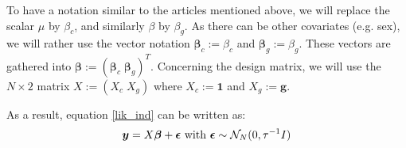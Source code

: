 \documentclass[10pt]{article}
\newcommand{\Norm}{{\mathcal{N}}} %
\newcommand{\yv}{\mbox{\boldmath$y$}}
\begin{document}
To have a notation similar to the articles mentioned above, we will replace the scalar $\mu$ by $\beta_c$, and similarly $\beta$ by $\beta_g$.
As there can be other covariates (e.g. sex), we will rather use the vector notation $\bm{\beta}_c := \beta_c$ and $\bm{\beta}_g := \beta_g$.
These vectors are gathered into $\bm{\beta} := (\bm{\beta}_c \; \bm{\beta}_g)^T$.
Concerning the design matrix, we will use the $N \times 2$ matrix $X := (X_c \; X_g)$ where $X_c := \bm{1}$ and $X_g := \bm{g}$.

As a result, equation \eqref{lik_ind} can be written as:
\begin{equation}
  \begin{aligned}
    \yv = X \bm{\beta} + \bm{\epsilon} \text{ with } \bm{\epsilon} \sim \Norm_N(0,\tau^{-1} I)
  \end{aligned}
\end{equation}
\end{document}
